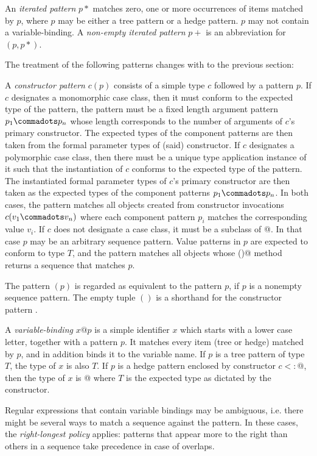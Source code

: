 {An {\em iterated pattern} $p*$ matches zero, one or more occurrences 
of items matched by $p$, where $p$ may be either a tree pattern or a hedge pattern. $p$ may not 
contain a variable-binding. A {\em non-empty iterated pattern} $p+$ is an 
abbreviation for $(p,p*)$. 

The treatment of the following patterns changes with to the 
previous section:

A {\em constructor pattern} $c(p)$ consists of a simple type $c$
followed by a pattern $p$.  If $c$ designates a monomorphic case
class, then it must conform to the expected type of the pattern, the
pattern must be a fixed length argument pattern $p_1 \commadots p_n$
whose length corresponds to the number of arguments of $c$'s primary
constructor. The expected types of the component patterns are then
taken from the formal parameter types of (said) constructor.  If $c$
designates a polymorphic case class, then there must be a unique type
application instance of it such that the instantiation of $c$ conforms
to the expected type of the pattern. The instantiated formal parameter
types of $c$'s primary constructor are then taken as the expected
types of the component patterns $p_1\commadots p_n$.  In both cases,
the pattern matches all objects created from constructor invocations
$c(v_1 \commadots v_n)$ where each component pattern $p_i$ matches the
corresponding value $v_i$. If $c$ does not designate a case class, it
must be a subclass of \lstinline@Seq[$T\,$]@. In that case $p$ may be an
arbitrary sequence pattern. Value patterns in $p$ are expected to conform to
type $T$, and the pattern matches all objects whose \lstinline@elements()@
method returns a sequence that matches $p$.

The pattern $(p)$ is regarded as equivalent to the pattern $p$, if $p$
is a nonempty sequence pattern. The empty tuple $()$ is a shorthand
for the constructor pattern .

A {\em variable-binding} $x @ p$ is a simple identifier $x$
which starts with a lower case letter, together with a pattern $p$. It
matches every item (tree or hedge) matched by $p$, and in addition binds 
it to the variable name. If $p$ is a tree pattern of type $T$, the type 
of $x$ is also $T$.
If $p$ is a hedge pattern enclosed by constructor $c <: $\lstinline@Seq[$T\,$]@,
then the type of $x$ is \lstinline@List[$T\,$]@
where $T$ is the expected type as dictated by the constructor. 

%
Regular expressions that contain variable bindings may be ambiguous,
i.e. there might be several ways to match a sequence against the
pattern. In these cases, the \emph{right-longest policy} applies:
patterns that appear more to the right than others in a sequence take
precedence in case of overlaps.

}
